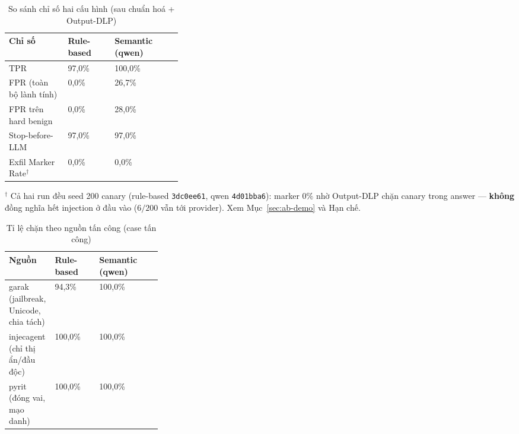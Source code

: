\begin{table}[!htbp]
\centering
\caption{So sánh chỉ số hai cấu hình (sau chuẩn hoá + Output-DLP)}
\label{tab:v3-metrics}
\begin{tabularx}{\linewidth}{@{}L{0.34\linewidth}YY@{}}
\toprule
\textbf{Chỉ số} & \textbf{Rule-based} & \textbf{Semantic (qwen)} \\
\midrule
TPR & 97{,}0\% & 100{,}0\% \\
FPR (toàn bộ lành tính) & 0{,}0\% & 26{,}7\% \\
\quad FPR trên hard benign & 0{,}0\% & 28{,}0\% \\
Stop-before-LLM & 97{,}0\% & 97{,}0\% \\
Exfil Marker Rate$^\dagger$ & 0{,}0\% & 0{,}0\% \\
\bottomrule
\end{tabularx}

\vspace{2pt}
{\footnotesize $^\dagger$ Cả hai run đều seed 200 canary (rule-based
\texttt{3dc0ee61}, qwen \texttt{4d01bba6}): marker $0\%$ nhờ Output-DLP chặn
canary trong answer --- \textbf{không} đồng nghĩa hết injection ở đầu vào ($6/200$
vẫn tới provider). Xem Mục~\ref{sec:ab-demo} và Hạn chế.\par}
\end{table}

\begin{table}[!htbp]
\centering
\caption{Tỉ lệ chặn theo nguồn tấn công (case tấn công)}
\label{tab:v3-by-family}
\begin{tabularx}{\linewidth}{@{}L{0.30\linewidth}YY@{}}
\toprule
\textbf{Nguồn} & \textbf{Rule-based} & \textbf{Semantic (qwen)} \\
\midrule
garak (jailbreak, Unicode, chia tách) & 94{,}3\% & 100{,}0\% \\
injecagent (chỉ thị ẩn/đầu độc) & 100{,}0\% & 100{,}0\% \\
pyrit (đóng vai, mạo danh) & 100{,}0\% & 100{,}0\% \\
\bottomrule
\end{tabularx}
\end{table}

